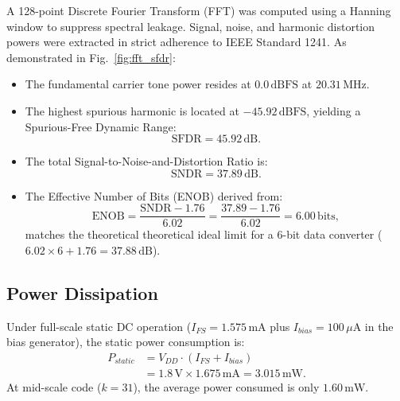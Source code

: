 \documentclass[conference,10pt]{IEEEtran}
\begin{document}
A 128-point Discrete Fourier Transform (FFT) was computed using a Hanning window to suppress spectral leakage. Signal, noise, and harmonic distortion powers were extracted in strict adherence to IEEE Standard 1241. As demonstrated in Fig.~\ref{fig:fft_sfdr}:
\begin{itemize}
    \item The fundamental carrier tone power resides at $0.0\,\text{dBFS}$ at $20.31\,\text{MHz}$.
    \item The highest spurious harmonic is located at $-45.92\,\text{dBFS}$, yielding a Spurious-Free Dynamic Range:
    \begin{equation}
    \text{SFDR} = 45.92\,\text{dB}.
    \end{equation}
    \item The total Signal-to-Noise-and-Distortion Ratio is:
    \begin{equation}
    \text{SNDR} = 37.89\,\text{dB}.
    \end{equation}
    \item The Effective Number of Bits (ENOB) derived from:
    \begin{equation}
    \text{ENOB} = \frac{\text{SNDR} - 1.76}{6.02} = \frac{37.89 - 1.76}{6.02} = 6.00\,\text{bits},
    \end{equation}
    matches the theoretical theoretical ideal limit for a 6-bit data converter ($6.02 \times 6 + 1.76 = 37.88\,\text{dB}$).
\end{itemize}

\subsection{Power Dissipation}
Under full-scale static DC operation ($I_{FS} = 1.575\,\text{mA}$ plus $I_{bias} = 100\,\mu\text{A}$ in the bias generator), the static power consumption is:
\begin{align}
P_{static} &= V_{DD} \cdot (I_{FS} + I_{bias}) \nonumber \\
           &= 1.8\,\text{V} \times 1.675\,\text{mA} = 3.015\,\text{mW}.
\end{align}
At mid-scale code ($k = 31$), the average power consumed is only $1.60\,\text{mW}$.
\end{document}
